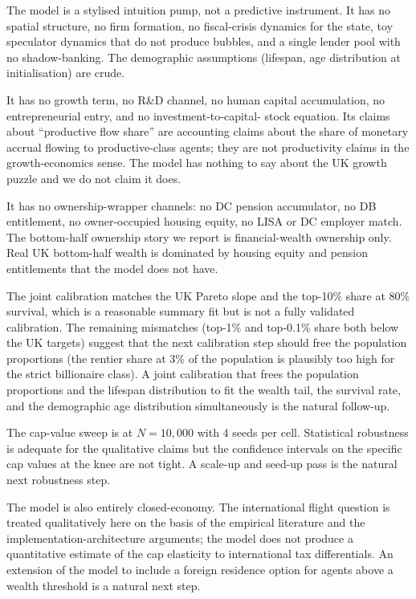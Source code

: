 \documentclass[11pt]{article}
\begin{document}
The model is a stylised intuition pump, not a predictive instrument.
It has no spatial structure, no firm formation, no fiscal-crisis
dynamics for the state, toy speculator dynamics that do not produce
bubbles, and a single lender pool with no shadow-banking.  The
demographic assumptions (lifespan, age distribution at
initialisation) are crude.

It has no growth term, no R\&D channel, no human capital
accumulation, no entrepreneurial entry, and no investment-to-capital-
stock equation.  Its claims about ``productive flow share''
are accounting claims about the share of monetary accrual flowing
to productive-class agents; they are not productivity claims in the
growth-economics sense.  The model has nothing to say about the UK
growth puzzle and we do not claim it does.

It has no ownership-wrapper channels: no DC pension accumulator, no
DB entitlement, no owner-occupied housing equity, no LISA or DC
employer match.  The bottom-half ownership story we report is
financial-wealth ownership only.  Real UK bottom-half wealth is
dominated by housing equity and pension entitlements that the model
does not have.

The joint calibration matches the UK Pareto slope and the top-10\%
share at 80\% survival, which is a reasonable summary fit but is
not a fully validated calibration.  The remaining mismatches
(top-1\% and top-0.1\% share both below the UK targets) suggest
that the next calibration step should free the population
proportions (the rentier share at 3\% of the population is
plausibly too high for the strict billionaire class).  A joint
calibration that frees the population proportions and the lifespan
distribution to fit the wealth tail, the survival rate, and the
demographic age distribution simultaneously is the natural follow-up.

The cap-value sweep is at $N = 10{,}000$ with 4 seeds per cell.
Statistical robustness is adequate for the qualitative claims but
the confidence intervals on the specific cap values at the knee
are not tight.  A scale-up and seed-up pass is the natural next
robustness step.

The model is also entirely closed-economy.  The international
flight question is treated qualitatively here on the basis of the
empirical literature and the implementation-architecture arguments;
the model does not produce a quantitative estimate of the cap
elasticity to international tax differentials.  An extension of the
model to include a foreign residence option for agents above a
wealth threshold is a natural next step.
\end{document}
